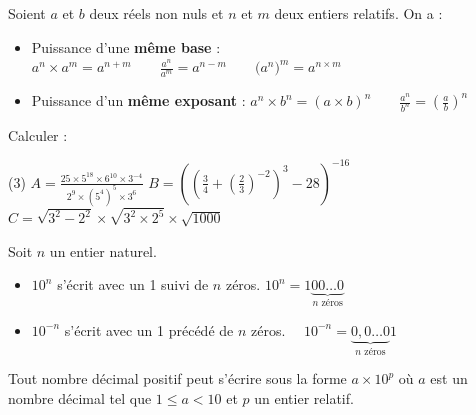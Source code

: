 \documentclass[10pt, a4paper]{article}
\begin{document}
\begin{Propriete}
Soient $a$ et $b$ deux réels non nuls et $n$ et $m$ deux entiers relatifs. On a :
\begin{itemize}
    \item Puissance d'une \textbf{même base} : \quad
        $a^n \times a^m = a^{n+m}
        \qquad
        \frac{a^n}{a^m} = a^{n-m}
        \qquad
        \big(a^n\big)^m = a^{n \times m}$
    
    \item Puissance d'un \textbf{même exposant} : \quad
        $a^n \times b^n = (a \times b)^n
        \qquad
        \frac{a^n}{b^n} = \left(\frac{a}{b}\right)^n$
    
\end{itemize}
\end{Propriete}

\begin{Application}[][15 min]
Calculer :

\begin{tasks}[label=$\bullet$, label-width=5pt, item-indent=15pt](3)
  \task $A = \frac{25 \times 5^{18} \times 6^{10} \times 3^{-4}}{2^9 \times (5^4)^5 \times 3^6}$
  \task $B = \left(\left(\frac{3}{4} + \left(\frac{2}{3}\right)^{-2}\right)^3 - 28\right)^{-16}$
  \task $C = \sqrt{3^2 - 2^2} \times \sqrt{3^2 \times 2^5} \times \sqrt{1000}$
\end{tasks}
\end{Application}

\begin{Propriete}[Puissance de 10]
Soit $n$ un entier naturel.
\begin{itemize}
    \item $10^n$ s'écrit avec un 1 suivi de $n$ zéros. 
    $10^n = 1\underbrace{00\dots0}_{n \text{ zéros}}$
    \item $10^{-n}$ s'écrit avec un 1 précédé de $n$ zéros.
    $\quad 10^{-n} = \underbrace{0,0\dots0}_{n \text{ zéros}}1$
\end{itemize}
\end{Propriete}

\begin{Definition}

Tout nombre décimal positif peut s'écrire sous la forme $a \times 10^p$ où $a$ est un nombre décimal tel que $1 \leq a < 10$ et $p$ un entier relatif.
\end{Definition}
\end{document}
